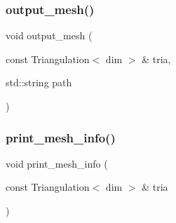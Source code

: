 \mbox{\label{group___supplementary_ga0272b346b175b931e89b017fd93b5b80}} 
\subsubsection{\texorpdfstring{output\_mesh()}{output\_mesh()}}
{\footnotesize\ttfamily void output\+\_\+mesh (\begin{DoxyParamCaption}\item[{const Triangulation$<$ dim $>$ \&}]{tria,  }\item[{std\+::string}]{path }\end{DoxyParamCaption})}

\mbox{\label{group___supplementary_ga2971a293263dddc17f3df81add2ffbbe}} 
\subsubsection{\texorpdfstring{print\_mesh\_info()}{print\_mesh\_info()}}
{\footnotesize\ttfamily void print\+\_\+mesh\+\_\+info (\begin{DoxyParamCaption}\item[{const Triangulation$<$ dim $>$ \&}]{tria }\end{DoxyParamCaption})}

